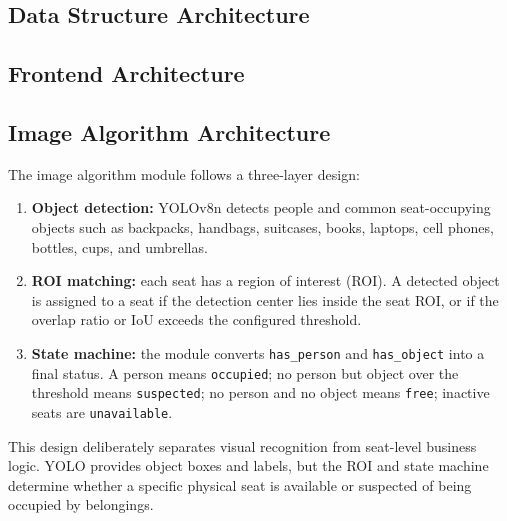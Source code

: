 \subsection{Data Structure Architecture}


\subsection{Frontend Architecture}


\subsection{Image Algorithm Architecture}

The image algorithm module follows a three-layer design:

\begin{enumerate}
  \item \textbf{Object detection:} YOLOv8n detects people and common seat-occupying objects such as backpacks, handbags, suitcases, books, laptops, cell phones, bottles, cups, and umbrellas.
  \item \textbf{ROI matching:} each seat has a region of interest (ROI). A detected object is assigned to a seat if the detection center lies inside the seat ROI, or if the overlap ratio or IoU exceeds the configured threshold.
  \item \textbf{State machine:} the module converts \texttt{has\_person} and \texttt{has\_object} into a final status. A person means \texttt{occupied}; no person but object over the threshold means \texttt{suspected}; no person and no object means \texttt{free}; inactive seats are \texttt{unavailable}.
\end{enumerate}

This design deliberately separates visual recognition from seat-level business logic. YOLO provides object boxes and labels, but the ROI and state machine determine whether a specific physical seat is available or suspected of being occupied by belongings.
